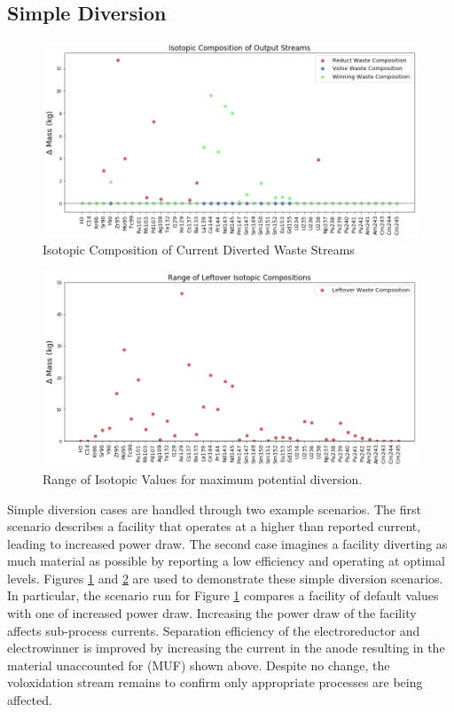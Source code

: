 \subsection{Simple Diversion}
\begin{figure} [h]
	\includegraphics[width=\linewidth]{images/current-isotope-comp}
	\caption{Isotopic Composition of Current Diverted Waste Streams}
	\label{fig:current-isotope-comp}
\end{figure}

\begin{figure} [h]
	\includegraphics[width=\linewidth]{images/isotopic-comp-range}
	\caption{Range of Isotopic Values for maximum potential diversion.}
	\label{fig:isotopic-range}
\end{figure}

Simple diversion cases are handled through two example scenarios. The first scenario describes a facility that operates at a higher than reported current, leading to increased power draw. The second case imagines a facility diverting as much material as possible by reporting a low efficiency and operating at optimal levels.
Figures \ref{fig:current-isotope-comp} and \ref{fig:isotopic-range} are used to demonstrate these simple diversion scenarios. In particular, the scenario run for Figure
\ref{fig:current-isotope-comp} compares a facility of default values with one of increased power draw. Increasing the power draw of the facility affects sub-process currents.
Separation efficiency of the electroreductor and electrowinner is improved by increasing the current in the anode resulting in the material unaccounted for (MUF) shown above. Despite no change, the voloxidation stream
remains to confirm only appropriate processes are being affected. 

